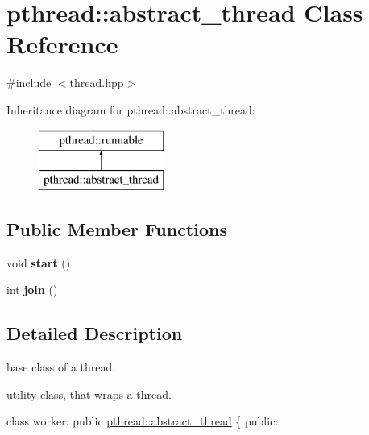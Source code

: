 \hypertarget{classpthread_1_1abstract__thread}{}\section{pthread\+:\+:abstract\+\_\+thread Class Reference}
\label{classpthread_1_1abstract__thread}


{\ttfamily \#include $<$thread.\+hpp$>$}

Inheritance diagram for pthread\+:\+:abstract\+\_\+thread\+:\begin{figure}[H]
\begin{center}
\leavevmode
\includegraphics[height=2.000000cm]{classpthread_1_1abstract__thread}
\end{center}
\end{figure}
\subsection*{Public Member Functions}
\begin{DoxyCompactItemize}
\item 
void {\bfseries start} ()\hypertarget{classpthread_1_1abstract__thread_ab121718028f3ca68d45db84d10ff2a3a}{}\label{classpthread_1_1abstract__thread_ab121718028f3ca68d45db84d10ff2a3a}

\item 
int {\bfseries join} ()\hypertarget{classpthread_1_1abstract__thread_aedac81bb9eb76ba92c49c48d797ea25b}{}\label{classpthread_1_1abstract__thread_aedac81bb9eb76ba92c49c48d797ea25b}

\end{DoxyCompactItemize}


\subsection{Detailed Description}
base class of a thread.

utility class, that wraps a thread. 
\begin{DoxyPre}{\ttfamily 
class worker: public \hyperlink{classpthread_1_1abstract__thread}{pthread::abstract\_thread} \{
public:}\end{DoxyPre}



